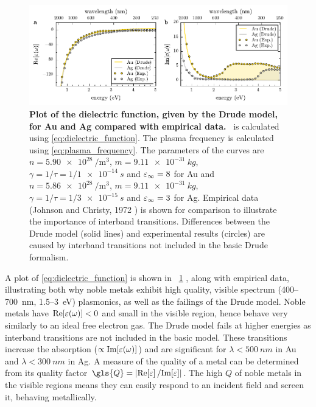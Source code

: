 \documentclass{article}
\begin{document}
\begin{figure}[bt]
\centering
\includegraphics{figures/dielectric_function}
\caption[Plot of the dielectric function, given by the Drude model, for Au and Ag compared with empirical data]{\textbf{Plot of the dielectric function, given by the Drude model, for Au and Ag compared with empirical data.} \dielectric\ is calculated using \eqref{eq:dielectric_function}. The plasma frequency is calculated using \eqref{eq:plasma_frequency}. The parameters of the curves are $n=\SI{5.90e28}{\per\metre\cubed}$, $m=\SI{9.11e-31}{kg}$, $\gamma=1/\tau=1/\SI{1e-14}{s}$ and $\varepsilon_\infty = 8$ for Au and $n=\SI{5.86e28}{\per\metre\cubed}$, $m=\SI{9.11e-31}{kg}$, $\gamma=1/\tau=1/\SI{3e-15}{s}$ and $\varepsilon_\infty = 3$ for Ag. Empirical data (Johnson and Christy, 1972 \cite{johnson1972optical}) is shown for comparison to illustrate the importance of interband transitions. Differences between the Drude model (solid lines) and experimental results (circles) are caused by interband transitions not included in the basic Drude formalism.}
\label{fig:dielectric_function}
\end{figure}

A plot of \eqref{eq:dielectric_function} is shown in \figurename~\ref{fig:dielectric_function} , along with empirical data, illustrating both why noble metals exhibit high quality, visible spectrum (400--\SI{700}{nm}, 1.5--\SI{3}{eV}) plasmonics, as well as the failings of the Drude model. Noble metals have $\mathrm{Re}\!\left[{\varepsilon(\omega)}\right]<0$ and small \imag{\dielectric} in the visible region, hence behave very similarly to an ideal free electron gas. The Drude model fails at higher energies as interband transitions are not included in the basic model. These transitions increase the absorption ($\propto\mathrm{Im}\!\left[{\varepsilon(\omega)}\right]$) and are significant for $\lambda < \SI{500}{nm}$ in Au and $\lambda<\SI{300}{nm}$ in Ag. A measure of the quality of a metal can be determined from its quality factor $\gls{Q} = \left|\real{\eps}/\imag{\eps}\right|$. The high $Q$ of noble metals in the visible regions means they can easily respond to an incident field and screen it, behaving metallically.
\end{document}
